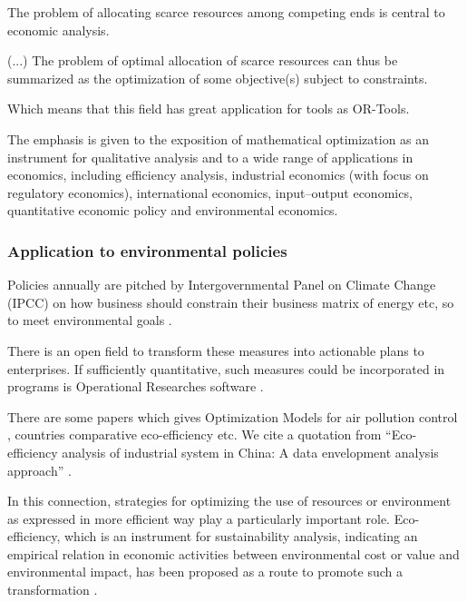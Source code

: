 \documentclass[
12pt,				%
openright,			%
oneside,			%
a4paper,			%
brazil,				%
english,			%
]{abntex2}
\begin{document}
\begin{citacao}
The problem of allocating scarce resources among competing ends is
central to economic analysis.

(...) The problem of optimal allocation of scarce resources can thus
be summarized as the optimization of some objective(s) subject to
constraints. \cite{luptacik2010mathematical}
\end{citacao}

Which means that this field has great application for tools as OR-Tools.

\begin{citacao}
The emphasis is given to the exposition of mathematical optimization as an
instrument for qualitative analysis and to a wide range of
applications in economics, including efficiency analysis, industrial
economics (with focus on regulatory economics), international
economics, input–output economics, quantitative economic policy and
environmental economics. \cite{luptacik2010mathematical}
\end{citacao}

\subsubsection{Application to environmental policies}
Policies annually are pitched by Intergovernmental Panel on Climate
Change (IPCC) on how business should constrain their business matrix
of energy etc, so to meet environmental goals
\cite{keysser20211}.

There is an open field to transform these
measures into actionable plans to enterprises. If sufficiently
quantitative, such measures could be incorporated in programs is
Operational Researches software \cite{luptacik2010mathematical}.

There are some papers which gives Optimization Models for
air pollution control \cite{abrams1975optimization}, countries comparative
eco-efficiency \cite{dyckhoff2001measuring} etc. We cite a quotation
from ``Eco-efficiency analysis of industrial system in China: A data
envelopment analysis approach'' \cite{zhang2008eco}.

\begin{citacao}
 In this connection, strategies for optimizing the use of resources or
environment as expressed in more efficient way play a
particularly important role. Eco-efficiency, which is an instrument for sustainability analysis, indicating an empirical
relation in economic activities between environmental cost
or value and environmental impact, has been proposed as a
route to promote such a transformation \cite{mickwitz2006regional}.
\end{citacao}
\end{document}
